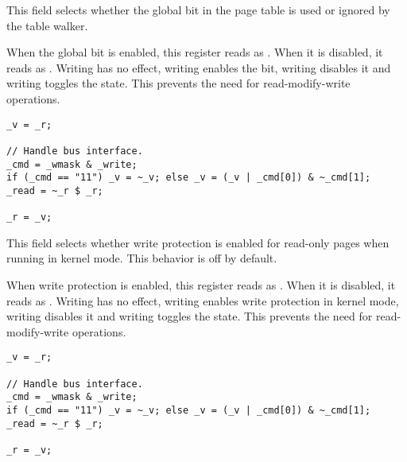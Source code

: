 This field selects whether the global bit in the page table is used or ignored
by the table walker.

When the global bit is enabled, this register reads as . When it is
disabled, it reads as . Writing  has no effect, writing
 enables the bit, writing  disables it and writing 
toggles the state. This prevents the need for read-modify-write operations.

\declaration{}
\implementation{}
\begin{lstlisting}
_v = _r;

// Handle bus interface.
_cmd = _wmask & _write;
if (_cmd == "11") _v = ~_v; else _v = (_v | _cmd[0]) & ~_cmd[1];
_read = ~_r $ _r;

_r = _v;
\end{lstlisting}

This field selects whether write protection is enabled for read-only pages when
running in kernel mode. This behavior is off by default.

When write protection is enabled, this register reads as . When it is
disabled, it reads as . Writing  has no effect, writing
 enables write protection in kernel mode, writing  disables it
and writing  toggles the state. This prevents the need for
read-modify-write operations.

\declaration{}
\implementation{}
\begin{lstlisting}
_v = _r;

// Handle bus interface.
_cmd = _wmask & _write;
if (_cmd == "11") _v = ~_v; else _v = (_v | _cmd[0]) & ~_cmd[1];
_read = ~_r $ _r;

_r = _v;
\end{lstlisting}


